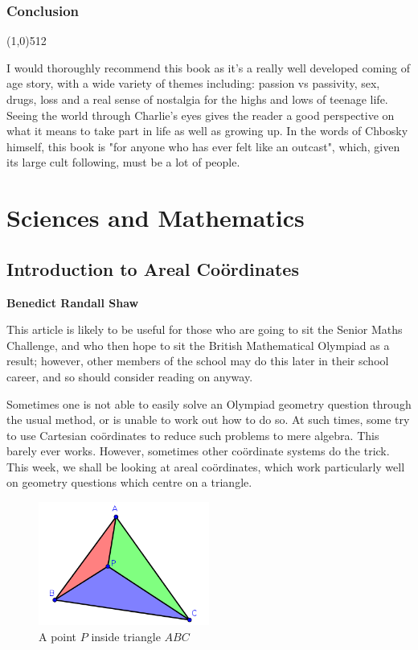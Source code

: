 \documentclass[11pt,a4paper]{report}
\let\origsection\subsection
\renewcommand{\subsection}[1]{\origsection{#1}\vspace{-0.5em}\line(1,0){512}\vspace{-1em}}
\begin{document}
	\subsection{Conclusion}
	
	\begin{multicols}{2}
		
		I would thoroughly recommend this book as it's a really well developed coming of age story, with a wide variety of themes including: passion vs passivity, sex, drugs, loss and a real sense of nostalgia for the highs and lows of teenage life. Seeing the world through Charlie's eyes gives the reader a good perspective on what it means to take part in life as well as growing up. In the words of Chbosky himself, this book is "for anyone who has ever felt like an outcast", which, given its large cult following, must be a lot of people.
		
	\end{multicols}
	
	\chapter{Sciences and Mathematics}
	
	\section{Introduction to Areal Coördinates}
	
	\textbf{Benedict Randall Shaw}
	
	\begin{multicols}{2}
		
		This article is likely to be useful for those who are going to sit the Senior Maths Challenge, and who then hope to sit the British Mathematical Olympiad as a result; however, other members of the school may do this later in their school career, and so should consider reading on anyway.
		
		Sometimes one is not able to easily solve an Olympiad geometry question through the usual method, or is unable to work out how to do so. At such times, some try to use Cartesian coördinates to reduce such problems to mere algebra. This barely ever works. However, sometimes other coördinate systems do the trick. This week, we shall be looking at areal coördinates, which work particularly well on geometry questions which centre on a triangle.
		
	\end{multicols}
	
	\begin{figure}[h]
		\centering
		\includegraphics[width=0.5\textwidth]{areals}
		\caption{A point \(P\) inside triangle \(ABC\)}
	\end{figure}
	
\end{document}
